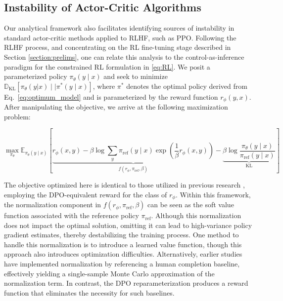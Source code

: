 \subsection{Instability of Actor-Critic Algorithms} Our analytical framework also facilitates identifying sources of instability in standard actor-critic methods applied to RLHF, such as PPO. Following the RLHF process, and concentrating on the RL fine-tuning stage described in Section \ref{section:prelims}, one can relate this analysis to the control-as-inference paradigm \cite{levine2018reinforcement} for the constrained RL formulation in \ref{eq:RL}. We posit a parameterized policy $\pi_{\theta}(y\mid x)$ and seek to minimize $\mathbb{D}_{\text{KL}}[\pi_{\theta}(y|x) \mid \mid \pi^*(y\mid x)]$, where $\pi^*$ denotes the optimal policy derived from Eq.~\ref{eq:optimum_model} and is parameterized by the reward function $r_{\phi}(y, x)$. After manipulating the objective, we arrive at the following maximization problem:

\begin{equation}\label{eq:AC}
    \max_{\pi_{\theta}}\mathbb{E}_{\pi_{\theta}(y\mid x)}\left[\underbrace{r_{\phi}(x, y) -\beta\log\sum_{y}\pi_\text{ref}(y\mid x)\exp\left(\frac{1}{\beta}r_{\phi}(x, y)\right)}_{f(r_{\phi}, \pi_\text{ref}, \beta)} - \underbrace{\beta\log\frac{\pi_{\theta}(y\mid x)}{\pi_\text{ref}(y\mid x)}}_{\text{KL}}\right]
\end{equation}

The objective optimized here is identical to those utilized in previous research 
\citep{ziegler2020finetuning, stiennon2022learning, bai2022training, ouyang2022training}, employing the DPO-equivalent reward for the class of $r_{\phi}$. Within this framework, the normalization component in $f(r_{\phi}, \pi_\text{ref}, \beta)$ can be seen as the soft value function associated with the reference policy $\pi_\text{ref}$. Although this normalization does not impact the optimal solution, omitting it can lead to high-variance policy gradient estimates, thereby destabilizing the training process. One method to handle this normalization is to introduce a learned value function, though this approach also introduces optimization difficulties. Alternatively, earlier studies have implemented normalization by referencing a human completion baseline, effectively yielding a single-sample Monte Carlo approximation of the normalization term. In contrast, the DPO reparameterization produces a reward function that eliminates the necessity for such baselines.

